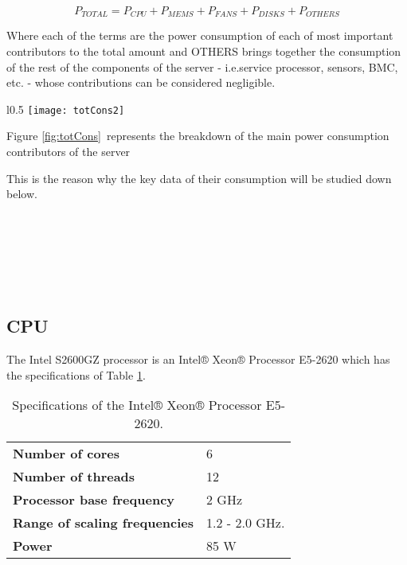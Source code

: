 \begin{equation*}
P_{TOTAL} = P_{CPU} + P_{MEMS} + P_{FANS} + P_{DISKS} + P_{OTHERS}
\end{equation*}

Where each of the terms are the power consumption of each of most important contributors to the total amount and OTHERS brings together the consumption of the rest of the components of the server - i.e.service processor, sensors, BMC, etc. - whose contributions can be considered negligible.

\begin{wrapfigure}{l}{0.5\textwidth}
    \centering
    \texttt{[image: totCons2]}
    \caption{Average Decathlete's power consumption breakdown}
    \label{fig:totCons} %
\end{wrapfigure}

Figure \ref{fig:totCons}~represents the breakdown of the main power consumption contributors of the server

This is the reason why the key data of their consumption will be studied down below.


\ \\ \ \\ \ \\ \ \\ \ \\
    \subsection{CPU}
    
    
    
    
    The Intel S2600GZ processor is an Intel® Xeon® Processor E5-2620 \cite{procDatasheet1} \cite{procDatasheet2} which has the specifications of Table \ref{tab:cpu_spec}.
    
\begin{table}[H]
\begin{center}
\begin{tabular}{p{6cm} p{3cm}}
  \hline
  \bf Number of cores & 6 \\
  \bf Number of threads & 12  \\
  \bf Processor base frequency & 2 GHz  \\
  \bf Range of scaling frequencies & 1.2 - 2.0 GHz. \\
  \bf Power & 85 W \\
  \hline
\end{tabular}
\end{center}
\caption{Specifications of the Intel® Xeon® Processor E5-2620. \cite{procTabla}}
\label{tab:cpu_spec}
\end{table}

